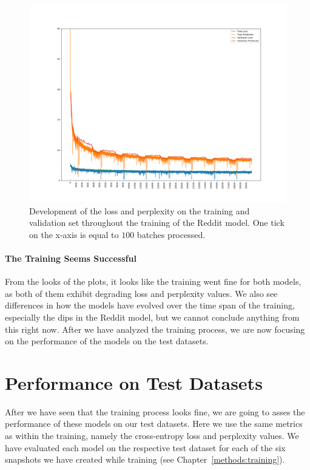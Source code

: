\begin{figure}[H]
	\includegraphics[width=\linewidth]{img/plots/reddit/train_metrics.png}
	\caption{Development of the loss and perplexity on the training and validation set throughout the training of the Reddit model. One tick on the x-axis is equal to $100$ batches processed.}
	\label{results:learning_process:metrics:reddit}
\end{figure} 

\paragraph{The Training Seems Successful} From the looks of the plots, it looks like the training went fine for both models, as both of them exhibit degrading loss and perplexity values. We also see differences in how the models have evolved over the time span of the training, especially the dips in the Reddit model, but we cannot conclude anything from this right now. After we have analyzed the training process, we are now focusing on the performance of the models on the test datasets.

\section{Performance on Test Datasets}
\label{results:performance_on_test_datasets}
After we have seen that the training process looks fine, we are going to asses the performance of these models on our test datasets. Here we use the same metrics as within the training, namely the cross-entropy loss and perplexity values. We have evaluated each model on the respective test dataset for each of the six snapshots we have created while training (see Chapter~\ref{methods:training}).


